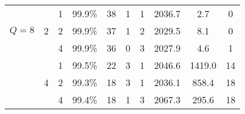 \begin{table}[h]
{\begin{tabular}{c|c|c|c|c|c|c|c|c|c}
     &   & 1 & 99.9\% & 38 & 1 & 1 & 2036.7 & 2.7 & 0\\ \rowcolor{gray!20}
     \cellcolor{white} $Q=8$ & 2 & 2 & 99.9\% & 37 & 1 & 2 & 2029.5 & 8.1 & 0\\ 
     &   & 4 & 99.9\% & 36 & 0 & 3 & 2027.9 & 4.6 & 1 \\ \cline{2-10}

     &   & 1 & 99.5\% & 22 & 3 & 1 & 2046.6 & 1419.0 & 14 \\ \rowcolor{gray!20}
     \cellcolor{white} & 4 & 2 & 99.3\% & 18 & 3 & 1 & 2036.1 & 858.4 & 18 \\ 
     &   & 4 & 99.4\% & 18 & 1 & 3 & 2067.3 & 295.6 & 18 \\
    
    \bottomrule
    \end{tabular}}
\end{table}
